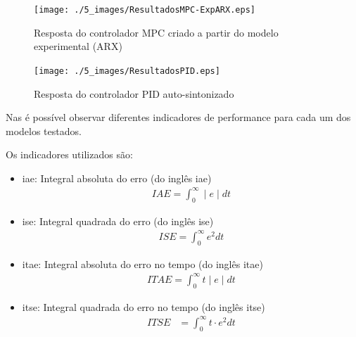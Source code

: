 \begin{figure}[!h]
	\caption{Resposta do controlador MPC criado a partir do modelo experimental (ARX)}
	\begin{center}
		\texttt{[image: ./5\_images/ResultadosMPC-ExpARX.eps]} 
		\label{fig:resultadosmpc-exparx}
	\end{center}
	\centering
\end{figure}

\clearpage

\begin{figure}[!h]
	\caption{Resposta do controlador PID auto-sintonizado}
	\begin{center}
		\texttt{[image: ./5\_images/ResultadosPID.eps]} 
		\label{fig:resultadospid}
	\end{center}
	\centering
\end{figure}

Nas  é possível observar diferentes indicadores
de performance para cada um dos modelos testados.

Os indicadores utilizados são:

\begin{itemize}
	\item \acrshort{iae}: Integral absoluta do erro (do inglês \acrlong{iae})
		\begin{align}
			IAE = \int_{0}^{\infty} \mid e \mid dt			\label{eq:iae}
		\end{align}
	\item \acrshort{ise}: Integral quadrada do erro (do inglês \acrlong{ise})
		\begin{align}
			ISE = \int_{0}^{\infty} e^{2} dt				\label{eq:ise}
		\end{align}
	\item \acrshort{itae}: Integral absoluta do erro no tempo (do inglês \acrlong{itae})
		\begin{align}
			ITAE = \int_{0}^{\infty} t \mid e \mid dt		\label{eq:itae}
		\end{align}
	\item \acrshort{itse}: Integral quadrada do erro no tempo (do inglês \acrlong{itse})
		\begin{align}
			ITSE &= \int_{0}^{\infty} t \cdot e^{2} dt		\label{eq:itse}
		\end{align}
\end{itemize}



